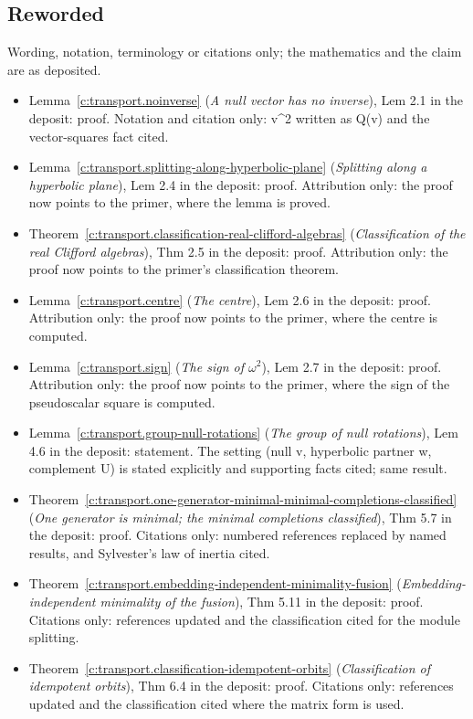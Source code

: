 \documentclass[11pt]{article}
\theoremstyle{definition}
\theoremstyle{plain}
\begin{document}
\subsection*{Reworded}
Wording, notation, terminology or citations only; the mathematics and the claim are as deposited.
\begin{itemize}\setlength{\itemsep}{2pt}
\item Lemma~\ref{c:transport.noinverse} (\emph{A null vector has no inverse}), Lem 2.1 in the deposit: proof. Notation and citation only: v\^{}2 written as Q(v) and the vector-squares fact cited.
\item Lemma~\ref{c:transport.splitting-along-hyperbolic-plane} (\emph{Splitting along a hyperbolic plane}), Lem 2.4 in the deposit: proof. Attribution only: the proof now points to the primer, where the lemma is proved.
\item Theorem~\ref{c:transport.classification-real-clifford-algebras} (\emph{Classification of the real Clifford algebras}), Thm 2.5 in the deposit: proof. Attribution only: the proof now points to the primer's classification theorem.
\item Lemma~\ref{c:transport.centre} (\emph{The centre}), Lem 2.6 in the deposit: proof. Attribution only: the proof now points to the primer, where the centre is computed.
\item Lemma~\ref{c:transport.sign} (\emph{The sign of $\omega^2$}), Lem 2.7 in the deposit: proof. Attribution only: the proof now points to the primer, where the sign of the pseudoscalar square is computed.
\item Lemma~\ref{c:transport.group-null-rotations} (\emph{The group of null rotations}), Lem 4.6 in the deposit: statement. The setting (null v, hyperbolic partner w, complement U) is stated explicitly and supporting facts cited; same result.
\item Theorem~\ref{c:transport.one-generator-minimal-minimal-completions-classified} (\emph{One generator is minimal; the minimal completions classified}), Thm 5.7 in the deposit: proof. Citations only: numbered references replaced by named results, and Sylvester's law of inertia cited.
\item Theorem~\ref{c:transport.embedding-independent-minimality-fusion} (\emph{Embedding-independent minimality of the fusion}), Thm 5.11 in the deposit: proof. Citations only: references updated and the classification cited for the module splitting.
\item Theorem~\ref{c:transport.classification-idempotent-orbits} (\emph{Classification of idempotent orbits}), Thm 6.4 in the deposit: proof. Citations only: references updated and the classification cited where the matrix form is used.

\end{itemize}
\end{document}
